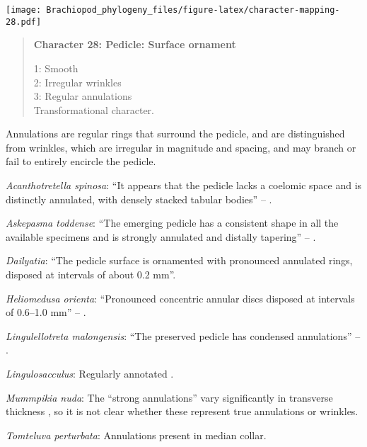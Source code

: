 \documentclass[openany]{book}
\theoremstyle{definition}
\theoremstyle{definition}
\theoremstyle{definition}
\theoremstyle{remark}
\begin{document}
\texttt{[image: Brachiopod\_phylogeny\_files/figure-latex/character-mapping-28.pdf]}

\begin{quote}
\textbf{Character 28: Pedicle: Surface ornament}

1: Smooth\\
2: Irregular wrinkles\\
3: Regular annulations\\
Transformational character.
\end{quote}

Annulations are regular rings that surround the pedicle, and are
distinguished from wrinkles, which are irregular in magnitude and
spacing, and may branch or fail to entirely encircle the pedicle.

\hypertarget{Acanthotretella_spinosa-coding-28}{}
\emph{Acanthotretella spinosa}: ``It appears that the pedicle lacks a
coelomic space and is distinctly annulated, with densely stacked tabular
bodies'' -- \citet{Zhang2011Anobolellate}.

\hypertarget{Askepasma_toddense-coding-28}{}
\emph{Askepasma toddense}: ``The emerging pedicle has a consistent shape
in all the available specimens and is strongly annulated and distally
tapering'' -- \citet{Holmer2018Evolutionarysignificance}.

\hypertarget{Dailyatia-coding-28}{}
\emph{Dailyatia}: ``The pedicle surface is ornamented with pronounced
annulated rings, disposed at intervals of about 0.2 mm''.

\hypertarget{Heliomedusa_orienta-coding-28}{}
\emph{Heliomedusa orienta}: ``Pronounced concentric annular discs
disposed at intervals of 0.6--1.0 mm'' --
\citet{Zhang2007Rhynchonelliformeanbrachiopods}.

\hypertarget{Lingulellotreta_malongensis-coding-28}{}
\emph{Lingulellotreta malongensis}: ``The preserved pedicle has
condensed annulations'' -- \citet{Zhang2011Theexceptionally}.

\hypertarget{Lingulosacculus-coding-28}{}
\emph{Lingulosacculus}: Regularly annotated \citep[see fig. 14.9
in][]{Hou2017Brachiopoda}.

\hypertarget{Mummpikia_nuda-coding-28}{}
\emph{Mummpikia nuda}: The ``strong annulations'' vary significantly in
transverse thickness \citep{Holmer2018Evolutionarysignificance}, so it
is not clear whether these represent true annulations or wrinkles.

\hypertarget{Tomteluva_perturbata-coding-28}{}
\emph{Tomteluva perturbata}: Annulations present in median collar.
\end{document}
